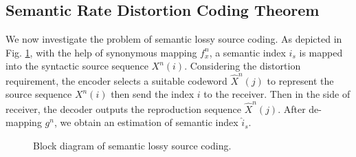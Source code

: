 \documentclass[12pt, draftclsnofoot,onecolumn]{IEEEtran}
\begin{document}
\subsection{Semantic Rate Distortion Coding Theorem}
We now investigate the problem of semantic lossy source coding. As depicted in Fig. \ref{Semantic_lossy_source_coding}, with the help of synonymous mapping $f_{x}^n$, a semantic index $i_s$ is mapped into the syntactic source sequence $X^n(i)$. Considering the distortion requirement, the encoder selects a suitable codeword $\hat{X}^n(j)$ to represent the source sequence $X^n(i)$ then send the index $i$ to the receiver. Then in the side of receiver, the decoder outputs the reproduction sequence $\hat{X}^n(j)$. After de-mapping $g^n$, we obtain an estimation of semantic index $\hat{i}_s$.

\begin{figure}[htbp]
\setlength{\abovecaptionskip}{0.cm}
\setlength{\belowcaptionskip}{-0.cm}
  \caption{Block diagram of semantic lossy source coding.}\label{Semantic_lossy_source_coding}
\end{figure}
\end{document}

